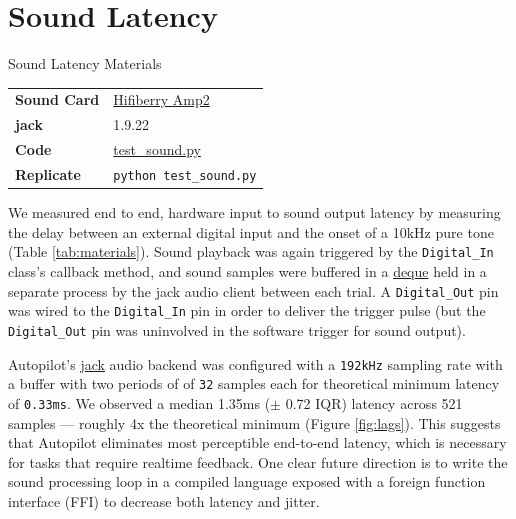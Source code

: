 \section{Sound Latency}
\label{sec:soundlatency}

\begin{margintable}[2cm]
\caption{Sound Latency Materials}
\label{tab:gpiomaterials}
\noindent\begin{tabularx}{\linewidth}{lX}%
\toprule
\textbf{Sound Card} & \href{https://wiki.auto-pi-lot.com/index.php/Hifiberry_Amp2}{Hifiberry Amp2} \\
\textbf{jack} & 1.9.22 \\
\textbf{Code} & \href{https://github.com/auto-pi-lot/plugin-paper/blob/main/plugin_paper/scripts/test_sound.py}{test\_sound.py} \\
\textbf{Replicate} & \texttt{python test\_sound.py} \\
\bottomrule
\end{tabularx}
\end{margintable}

We measured end to end, hardware input to sound output latency by measuring the delay between an external digital input and the onset of a 10kHz pure tone (Table \ref{tab:materials}). Sound playback was again triggered by the \texttt{Digital\_In} class's callback method, and sound samples were buffered in a \href{https://docs.python.org/3/library/collections.html#collections.deque}{deque} held in a separate process by the jack audio client between each trial. A \texttt{Digital\_Out} pin was wired to the \texttt{Digital\_In} pin in order to deliver the trigger pulse (but the \texttt{Digital\_Out} pin was uninvolved in the software trigger for sound output).

Autopilot's \href{http://jackaudio.org/}{jack} audio backend was configured with a \texttt{192kHz} sampling rate with a buffer with two periods of of \texttt{32} samples each for theoretical minimum latency of \texttt{0.33ms}. We observed a median 1.35ms ($\pm$ 0.72 IQR) latency across 521 samples --- roughly 4x the theoretical minimum (Figure \ref{fig:lags}). This suggests that Autopilot eliminates most perceptible end-to-end latency, which is necessary for tasks that require realtime feedback. One clear future direction is to write the sound processing loop in a compiled language exposed with a foreign function interface (FFI) to decrease both latency and jitter.

